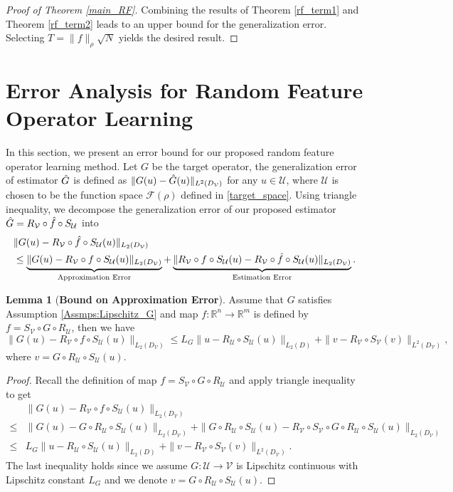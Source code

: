 \documentclass[11pt,twoside]{article}
\theoremstyle{plain}
\theoremstyle{definition}
\newtheorem{lemma}{Lemma}[section]
\theoremstyle{remark}
\newcommand{\R}{\mathbb{R}}
\newcommand{\Uc}{\mathcal{U}}
\newcommand{\Vc}{\mathcal{V}}
\newcommand{\Fc}{\mathcal{F}}
\begin{document}
\begin{proof}[Proof of Theorem \ref{main_RF}]
Combining the results of Theorem \ref{rf_term1} and Theorem \ref{rf_term2} leads to an upper bound for the generalization error. Selecting $T=\|f\|_\rho \sqrt{N}$ yields the desired result. 
\end{proof}

\section{Error Analysis for Random Feature Operator Learning}
\label{Sec:Operator}
In this section, we present an error bound for our proposed random feature operator learning method. 
Let $G$ be the target operator, the generalization error of estimator $\Hat{G}$ is defined as $\|G(u) - \Hat{G}(u)\|_{L^2(D_\Vc)}$ for any $u\in\Uc$, where $\Uc$ is chosen to be the function space $\Fc(\rho)$ defined in \eqref{target_space}.
Using triangle inequality, we decompose the generalization error of our proposed estimator $\Hat{G} = R_\Vc\circ\Hat{f}\circ S_\Uc$ into 
\begin{equation*}
\begin{aligned}
& \|G(u) - R_\Vc\circ\Hat{f}\circ S_\Uc(u)\|_{L_2(D_\Vc)} \\
& \leq \underbrace{\|G(u) - R_\Vc\circ f\circ S_\Uc(u)\|_{L_2(D_\Vc)}}_{\text{Approximation Error}} + \underbrace{ \|R_\Vc\circ f\circ S_\Uc(u) - R_\Vc\circ\Hat{f}\circ S_\Uc(u)\|_{L_2(D_\Vc)} }_{\text{Estimation Error}}.
\end{aligned}
\end{equation*}

\begin{lemma}[{\bf Bound on Approximation Error}]
\label{operator_lemma1}
Assume that $G$ satisfies Assumption \ref{Assmps:Lipschitz_G} and map $f:\R^n\to\R^m$ is defined by $f=S_\Vc\circ G\circ R_\Uc$, then we have
\begin{equation*}
\|G(u) - R_\Vc\circ f\circ S_\Uc(u)\|_{L_2(D_\Vc)} \leq L_G \| u - R_\Uc\circ S_\Uc(u)\|_{L_2(D)} + \| v - R_\Vc \circ S_\Vc(v)\|_{L^2(D_\Vc)},
\end{equation*}
where $v = G\circ R_\Uc\circ S_\Uc(u)$. 
\end{lemma}
\begin{proof}
Recall the definition of map $f=S_\Vc\circ G\circ R_\Uc$ and apply triangle inequality to get
\begin{equation*}
\begin{aligned}
& \|G(u) - R_\Vc\circ f\circ S_\Uc(u)\|_{L_2(D_\Vc)} \\
\leq & \|G(u) - G\circ R_\Uc\circ S_\Uc(u)\|_{L_2(D_\Vc)} + \|G\circ R_\Uc\circ S_\Uc(u) - R_\Vc\circ S_\Vc\circ G\circ R_\Uc \circ S_\Uc(u)\|_{L_2(D_\Vc)} \\
\leq & L_G \| u - R_\Uc\circ S_\Uc(u)\|_{L_2(D)} + \| v - R_\Vc \circ S_\Vc(v)\|_{L^2(D_\Vc)}.
\end{aligned}
\end{equation*}
The last inequality holds since we assume $G:\Uc\to \Vc$ is Lipschitz continuous with Lipschitz constant $L_G$ and we denote $v=G\circ R_\Uc\circ S_\Uc(u)$.
\end{proof}
\end{document}
